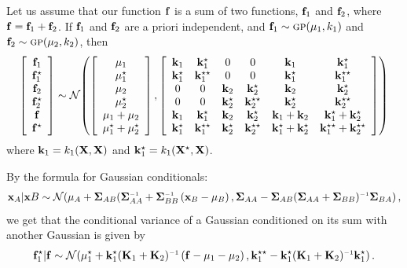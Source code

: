 \documentclass[twoside]{article}
\begin{document}
Let us assume that our function ${\bf{f}}$ is a sum of two functions, ${\bf{f}}_1$ and ${\bf{f}}_2$, where ${\bf{f}} = {\bf{f}}_1 + {\bf{f}}_2$.  If ${\bf{f}}_1$ and ${\bf{f}}_2$ are a priori independent, and ${\bf{f}}_1 \sim {\textsc{gp}}( {\bf{\mu}}_1, k_1)$ and ${\bf{f}}_2 \sim {\textsc{gp}}( {\bf{\mu}}_2, k_2)$, then
\begin{align}
\left[ \begin{array}{c} {\bf{f}}_1 \\ {\bf{f}}_1^\star \\ {\bf{f}}_2 \\ {\bf{f}}_2^\star \\ {\bf{f}} \\ {\bf{f}}^\star \end{array} \right]
\sim
\mathcal{N}\!\left(\left[ \begin{array}{c} {\bf{\mu}}_1 \\ {\bf{\mu}}_1^\star \\ {\bf{\mu}}_2 \\ {\bf{\mu}}_2^\star \\ {\bf{\mu}}_1 + {\bf{\mu}}_2 \\ {\bf{\mu}}_1^\star + {\bf{\mu}}_2^\star \end{array} \right]
,\left[ \begin{array}{cccccc} 
{\bf{k}}_1 & {\bf{k}}_1^\star & 0 & 0 & {\bf{k}}_1 & {\bf{k}}_1^\star \\ 
{\bf{k}}_1^\star & {\bf{k}}_1^{\star\star} & 0 & 0 & {\bf{k}}_1^\star & {\bf{k}}_1^{\star\star} \\
0 & 0 & {\bf{k}}_2 & {\bf{k}}_2^\star & {\bf{k}}_2 & {\bf{k}}_2^\star \\ 
0 & 0 & {\bf{k}}_2^\star & {\bf{k}}_2^{\star\star} & {\bf{k}}_2^\star & {\bf{k}}_2^{\star\star} \\
{\bf{k}}_1 & {\bf{k}}_1^\star & {\bf{k}}_2 & {\bf{k}}_2^\star & {\bf{k}}_1 + {\bf{k}}_2 & {\bf{k}}_1^\star + {\bf{k}}_2^\star \\ 
{\bf{k}}_1^\star & {\bf{k}}_1^{\star\star}  & {\bf{k}}_2^\star & {\bf{k}}_2^{\star\star}  & {\bf{k}}_1^\star + {\bf{k}}_2^\star & {\bf{k}}_1^{\star\star} + {\bf{k}}_2^{\star\star}\\
\end{array} \right]
\right)
\end{align}
where ${\bf{k}}_1 = k_1( \mathbf{X}, \mathbf{X} )$ and ${\bf{k}}_1^\star = k_1( \mathbf{X}^\star, \mathbf{X} )$. 

By the formula for Gaussian conditionals:
\begin{align}
\vx_A | \vx B \sim \Nt{\vmu_A + \vSigma_{AB} (\vSigma_{AA}\inv + \vSigma_{BB}\inv \left( \vx_B - \vmu_B \right) }
{\vSigma_{AA} - \vSigma_{AB} (\vSigma_{AA} + \vSigma_{BB})\inv \vSigma_{BA} },
\end{align}
we get that the conditional variance of a Gaussian conditioned on its sum with another Gaussian is given by
\begin{align}
\vf_1^\star | \vf \sim \Nt{\vmu_1^\star + \vk_1^\star (\vK_1 + \vK_2)\inv \left( \vf - \vmu_1 - \vmu_2 \right) }
{\vk_1^{\star\star} - \vk_1^\star (\vK_1 + \vK_2)\inv \vk_1^\star }.
\end{align}
\end{document}
